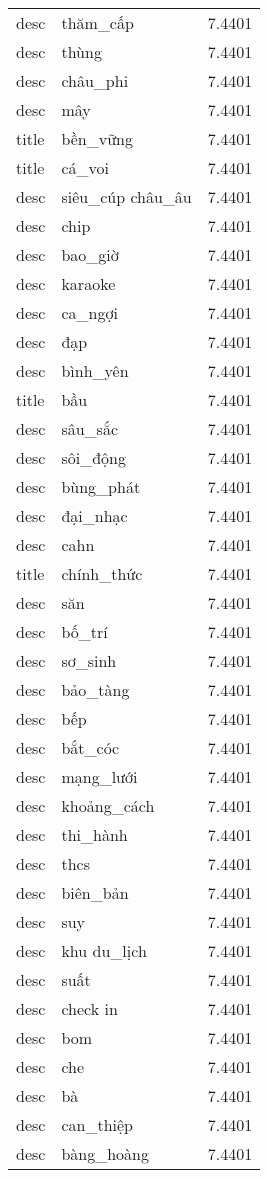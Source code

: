 \documentclass{article}
\begin{document}
\begin{tabular}{lll}
desc & thăm\_cấp & 7.4401\\
desc & thùng & 7.4401\\
desc & châu\_phi & 7.4401\\
desc & mây & 7.4401\\
title & bền\_vững & 7.4401\\
title & cá\_voi & 7.4401\\
desc & siêu\_cúp châu\_âu & 7.4401\\
desc & chip & 7.4401\\
desc & bao\_giờ & 7.4401\\
desc & karaoke & 7.4401\\
desc & ca\_ngợi & 7.4401\\
desc & đạp & 7.4401\\
desc & bình\_yên & 7.4401\\
title & bầu & 7.4401\\
desc & sâu\_sắc & 7.4401\\
desc & sôi\_động & 7.4401\\
desc & bùng\_phát & 7.4401\\
desc & đại\_nhạc & 7.4401\\
desc & cahn & 7.4401\\
title & chính\_thức & 7.4401\\
desc & săn & 7.4401\\
desc & bố\_trí & 7.4401\\
desc & sơ\_sinh & 7.4401\\
desc & bảo\_tàng & 7.4401\\
desc & bếp & 7.4401\\
desc & bắt\_cóc & 7.4401\\
desc & mạng\_lưới & 7.4401\\
desc & khoảng\_cách & 7.4401\\
desc & thi\_hành & 7.4401\\
desc & thcs & 7.4401\\
desc & biên\_bản & 7.4401\\
desc & suy & 7.4401\\
desc & khu du\_lịch & 7.4401\\
desc & suất & 7.4401\\
desc & check in & 7.4401\\
desc & bom & 7.4401\\
desc & che & 7.4401\\
desc & bà & 7.4401\\
desc & can\_thiệp & 7.4401\\
desc & bàng\_hoàng & 7.4401\\

\end{tabular}
\end{document}

